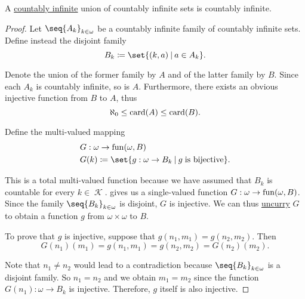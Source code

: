 \begin{proposition}\label{thm:countably_infinite_union_of_countably_infinite_sets}
  A \hyperref[def:set_countability/countably_infinite]{countably infinite} union of countably infinite sets is countably infinite.
\end{proposition}
\begin{proof}
  Let \( \seq{ A_k }_{k \in \omega} \) be a countably infinite family of countably infinite sets. Define instead the disjoint family
  \begin{equation*}
    B_k \coloneqq \set{ (k, a) \given a \in A_k }.
  \end{equation*}

  Denote the union of the former family by \( A \) and of the latter family by \( B \). Since each \( A_k \) is countably infinite, so is \( A \). Furthermore, there exists an obvious injective function from \( B \) to \( A \), thus
  \begin{equation}\label{thm:countably_infinite_union_of_countably_infinite_sets/union_card_inequality}
    \aleph_0 \leq \operatorname{card}(A) \leq \operatorname{card}(B).
  \end{equation}

  Define the multi-valued mapping
  \begin{equation*}
    \begin{aligned}
      &G: \omega \to \fun(\omega, B) \\
      &G(k) \coloneqq \set{ g: \omega \to B_k \given g \T{is bijective} }.
    \end{aligned}
  \end{equation*}

  This is a total multi-valued function because we have assumed that \( B_k \) is countable for every \( k \in \mscrK \).  gives us a single-valued function \( G: \omega \to \operatorname{fun}(\omega, B) \). Since the family \( \seq{ B_k }_{k \in \omega} \) is disjoint, \( G \) is injective. We can thus \hyperref[def:function/currying]{uncurry} \( G \) to obtain a function \( g \) from \( \omega \times \omega \) to \( B \).

  To prove that \( g \) is injective, suppose that \( g(n_1, m_1) = g(n_2, m_2) \). Then
  \begin{equation*}
    G(n_1)(m_1) = g(n_1, m_1) = g(n_2, m_2) = G(n_2)(m_2).
  \end{equation*}

  Note that \( n_1 \neq n_2 \) would lead to a contradiction because  \( \seq{ B_k }_{k \in \omega} \) is a disjoint family. So \( n_1 = n_2 \) and we obtain \( m_1 = m_2 \) since the function \( G(n_1): \omega \to B_k \) is injective. Therefore, \( g \) itself is also injective.


\end{proof}
